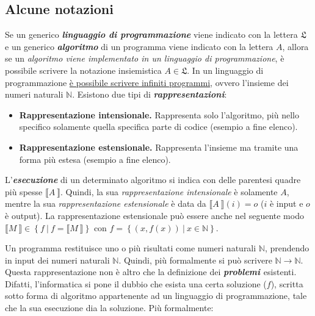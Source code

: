 \documentclass[a4paper]{article}
\newcommand{\exec}[1]{\llbracket #1\:\rrbracket}
\begin{document}
	\newpage
	
	\subsection{Alcune notazioni}
	
	Se un generico \textbf{\emph{linguaggio di programmazione}} viene indicato con la lettera $\mathfrak{L}$ e un generico \textbf{\emph{algoritmo}} di un programma viene indicato con la lettera $A$, allora se un \emph{algoritmo viene implementato in un linguaggio di programmazione}, è possibile scrivere la notazione insiemistica $A \in \mathfrak{L}$. In un linguaggio di programmazione \underline{è possibile scrivere infiniti programmi}, ovvero l'insieme dei numeri naturali $\mathbb{N}$. \newline
	\noindent
	Esistono due tipi di \textbf{\emph{rappresentazioni}}:

	\begin{itemize}
		\item[\ding{42}] \textbf{Rappresentazione intensionale.} Rappresenta solo l'algoritmo, più nello specifico solamente quella specifica parte di codice (esempio a fine elenco).
		
		\item[\ding{42}] \textbf{Rappresentazione estensionale.} Rappresenta l'insieme ma tramite una forma più estesa (esempio a fine elenco).
	\end{itemize}
	
	L'\textbf{\emph{esecuzione}} di un determinato algoritmo si indica con delle parentesi quadre più spesse $\exec{A}$. Quindi, la sua \emph{rappresentazione intensionale} è solamente $A$, mentre la sua \emph{rappresentazione estensionale} è data da $\exec{A}(i) = o$ ($i$ è input e $o$ è output). La rappresentazione estensionale può essere anche nel seguente modo $\exec{M} \in \left\{f\: | \: f =\exec{M}\right\}$
	con $f = \left\{ \left(x, f(x)\right)\: | \: x \in \mathbb{N}\right\}$.
	
	Un programma restituisce uno o più risultati come numeri naturali $\mathbb{N}$, prendendo in input dei numeri naturali $\mathbb{N}$. Quindi, più formalmente si può scrivere $\mathbb{N} \longrightarrow \mathbb{N}$. Questa rappresentazione non è altro che la definizione dei \textbf{\emph{problemi \label{def:problema}}} esistenti. Difatti, l'informatica si pone il dubbio che esista una certa soluzione ($f$), scritta sotto forma di algoritmo appartenente ad un linguaggio di programmazione, tale che la sua esecuzione dia la soluzione. Più formalmente:
	
\end{document}
